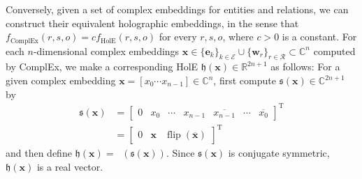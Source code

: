 \documentclass[11pt,a4paper]{article}
\def\mat#1{\boldsymbol{\mathbf{#1}}}
\def\transpose{^{\mathrm{T}}}
\def\Cset{\mathbb{C}}
\def\Rset{\mathbb{R}}
\def\IDFT{\mathop{\mathfrak{F}^{-1}}}
\def\flip{\mathop{\text{flip}}}
\begin{document}
Conversely, given a set of complex embeddings for entities and relations, we can construct their equivalent holographic embeddings, in the sense
that $f_{\text{ComplEx}}(r,s,o) = c f_{\text{HolE}}(r,s,o)$ for every $r, s, o$,
where $c > 0$ is a constant. %
For each $n$-dimensional complex embeddings
$\mat{x} \in \{ \mat{e}_k \}_{k \in \mathcal{E}} \cup \{ \mat{w}_r \}_{r \in \mathcal{R}} \subset \Cset^n$
computed by ComplEx,
we make a corresponding HolE $\mathfrak{h}(\mat{x}) \in \Rset^{2n+1}$ as follows:
For a given complex embedding $\mat{x} = [x_0 \cdots x_{n-1}] \in \Cset^n$,
first compute $\mathfrak{s}(\mat{x}) \in \Cset^{2n+1}$
by
\begin{align}
  \mathfrak{s}(\mat{x})
  & = \begin{bmatrix} 0 & x_0 & \cdots & x_{n-1} & \overline{x_{n-1}} & \cdots & \overline{x_{0}} \end{bmatrix} \transpose \nonumber \\
  & = \begin{bmatrix} 0 & \mat{x} & \flip( \overline{ \mat{x} } ) \end{bmatrix} \transpose \label{eq:s()}
\end{align}
and then define
$
  \mathfrak{h}(\mat{x}) = \IDFT(\mathfrak{s}(\mat{x})).
$
Since $\mathfrak{s}(\mat{x})$ is conjugate symmetric,
$\mathfrak{h}(\mat{x})$ is a real vector.
\end{document}
